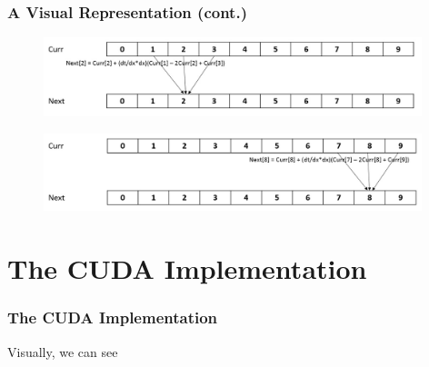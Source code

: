 \documentclass{beamer}
\begin{document}
\begin{frame}
	\frametitle{A Visual Representation (cont.)}
	\begin{figure}
		\includegraphics[width=11cm]{Visual2.jpg}
	\end{figure}
	\bigskip
	\begin{figure}
		\includegraphics[width=11cm]{Visual3.jpg}
	\end{figure}
\end{frame}

\section{The CUDA Implementation}
\begin{frame}
	\frametitle{The CUDA Implementation}
	Visually, we can see 
\end{frame}
\end{document}
